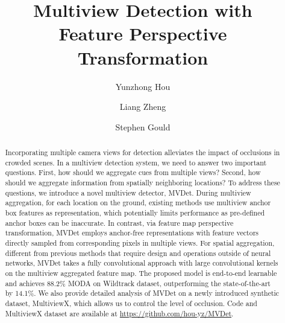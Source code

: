 \documentclass[runningheads]{llncs}
\begin{document}
\pagestyle{headings}
\mainmatter
\def\ECCVSubNumber{116}  

\title{Multiview Detection with\\ Feature Perspective Transformation} 

\begin{comment}
\titlerunning{ECCV-20 submission ID \ECCVSubNumber} 
\authorrunning{ECCV-20 submission ID \ECCVSubNumber} 
\author{Anonymous ECCV submission}
\institute{Paper ID \ECCVSubNumber}
\end{comment}


\author{Yunzhong Hou \and
Liang Zheng \and
Stephen Gould}
\maketitle

\begin{abstract}


Incorporating multiple camera views for detection alleviates the impact of occlusions in crowded scenes. In a multiview detection system, we need to answer two important questions. First, how should we aggregate cues from multiple views? Second, how should we aggregate information from spatially neighboring locations? To address these questions, we introduce a novel multiview detector, MVDet. During multiview aggregation, for each location on the ground, existing methods use multiview anchor box features as representation, which potentially limits performance as pre-defined anchor boxes can be inaccurate. In contrast, via feature map perspective transformation, MVDet employs anchor-free representations with feature vectors directly sampled from corresponding pixels in multiple views. For spatial aggregation, different from previous methods that require design and operations outside of neural networks, MVDet takes a fully convolutional approach with large convolutional kernels on the multiview aggregated feature map. The proposed model is end-to-end learnable and achieves 88.2\% MODA on Wildtrack dataset, outperforming the state-of-the-art by 14.1\%. We also provide detailed analysis of MVDet on a newly introduced synthetic dataset, MultiviewX, which allows us to control the level of occlusion. Code and MultiviewX dataset are available at \url{https://github.com/hou-yz/MVDet}.






\end{abstract}
\end{document}
